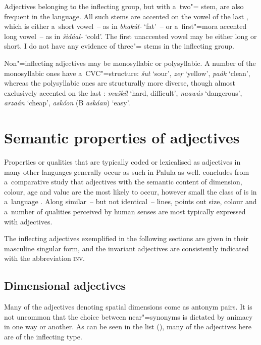 Adjectives belonging to the inflecting group, but with a~two"= stem, are also frequent in the language. All such stems are accented on the vowel of the last , which is either a~short vowel~-- as in \textit{bhakúl-} `fat'~-- or a~first"=mora accented long vowel~-- as in \textit{šidáal-} `cold'. The first unaccented vowel may be either long or short. I do not have any evidence of three"=  stems in the inflecting group.


Non"=inflecting adjectives may be monosyllabic or polysyllabic. A number of the monosyllabic ones have a~CVC"=structure: \textit{šut} `sour', \textit{zeṛ} `yellow', \textit{paák} `clean', whereas the polysyllabic ones are structurally more diverse, though almost exclusively accented on the last : \textit{muškíl} `hard, difficult', \textit{naawás} `dangerous', \textit{arzaán} `cheap', \textit{askóon} (B \textit{askáan}) `easy'. 


\section{Semantic properties of adjectives}
\label{sec:6-2}

Properties or qualities that are typically coded or lexicalised as adjectives in many other languages generally occur as such in Palula as well. \citeauthor{dixon1982} concludes from a~comparative study that adjectives with the semantic content of dimension, colour, age and value are the most likely to occur, however small the class of  is in a~language \citep[46]{dixon1982}. Along similar~-- but not identical~-- lines, \citet[82]{givon2001a} points out size, colour and a~number of qualities perceived by human senses are most typically expressed with adjectives. 



The inflecting adjectives exemplified in the following sections are given in their masculine singular form, and the invariant adjectives are consistently indicated with the abbreviation \textsc{inv}.


\subsection{Dimensional adjectives}
\label{subsec:6-2-1}

Many of the adjectives denoting spatial dimensions come as antonym pairs. It is not uncommon that the choice between near"=synonyms is dictated by animacy in one way or another. As can be seen in the list (), many of the adjectives here are of the inflecting type.


